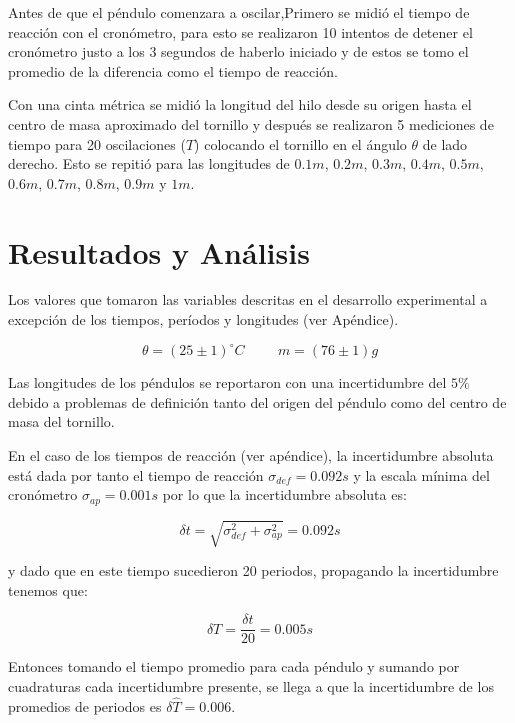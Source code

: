 \documentclass[DIV=calc, paper=a4, fontsize=11pt]{scrartcl}
\begin{document}
\begin{multicols}{2}
Antes de que el péndulo comenzara a oscilar,Primero se midió el tiempo de reacción con el cronómetro, para esto se realizaron 10 intentos de detener el cronómetro justo a los 3 segundos de haberlo iniciado y de estos se tomo el promedio de la diferencia como el tiempo de reacción.

 Con una cinta métrica se midió la longitud del hilo desde su origen hasta el centro de masa aproximado del tornillo y después se realizaron 5 mediciones de tiempo para 20 oscilaciones ($T$) colocando el tornillo en el ángulo $\theta$ de lado derecho. Esto se repitió para las longitudes de $0.1 m$, $0.2 m$, $0.3 m$, $0.4 m$, $0.5 m$, $0.6 m$, $0.7 m$, $0.8 m$, $0.9 m$ y $1m$.

\section*{Resultados y Análisis}



Los valores que tomaron las variables descritas en el desarrollo experimental a excepción de los  tiempos, períodos y longitudes (ver Apéndice).

\begin{equation*}
    \theta = (25 \pm 1) ^{\circ}C \hspace{1cm} m = (76 \pm 1)g
\end{equation*}

Las longitudes de los péndulos se reportaron con una incertidumbre del $5\%$ debido a problemas de definición tanto del origen del péndulo como del centro de masa del tornillo.

En el caso de los tiempos de reacción (ver apéndice), la incertidumbre absoluta está dada por tanto el tiempo de reacción $\sigma_{def} = 0.092 s$ y la escala mínima del cronómetro $\sigma_{ap} = 0.001s$ por lo que la incertidumbre absoluta es:

\begin{equation*}
    \delta t = \sqrt{\sigma_{def}^2 + \sigma_{ap}^2} = 0.092 s
\end{equation*}

\noindent y dado que en este tiempo sucedieron 20 periodos, propagando la incertidumbre tenemos que:

\begin{equation*}
    \delta T = \frac{\delta t}{20} = 0.005 s
 \end{equation*}
 
 Entonces tomando el tiempo promedio para cada péndulo y sumando por cuadraturas cada incertidumbre presente, se llega a que la incertidumbre de los promedios de periodos es $\delta \hat{T} = 0.006$.


\end{multicols}
\end{document}
